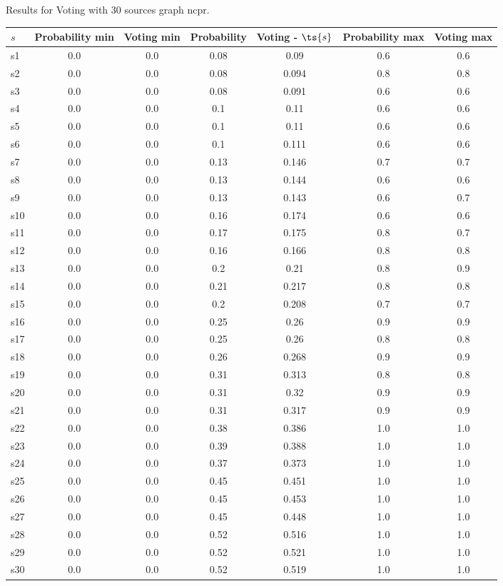 \documentclass{article}
\begin{document}
\noindent Results for Voting with 30 sources graph ncpr.

\noindent\begin{tabular}{|l|c|c|c|c|c|c|}
\hline
$s$& Probability min & Voting min & Probability & Voting - $\ts{s}$ & Probability max & Voting max\\
\hline
s1 &0.0 & 0.0 & 0.08 & 0.09 & 0.6 & 0.6\\
\hline
s2 &0.0 & 0.0 & 0.08 & 0.094 & 0.8 & 0.8\\
\hline
s3 &0.0 & 0.0 & 0.08 & 0.091 & 0.6 & 0.6\\
\hline
s4 &0.0 & 0.0 & 0.1 & 0.11 & 0.6 & 0.6\\
\hline
s5 &0.0 & 0.0 & 0.1 & 0.11 & 0.6 & 0.6\\
\hline
s6 &0.0 & 0.0 & 0.1 & 0.111 & 0.6 & 0.6\\
\hline
s7 &0.0 & 0.0 & 0.13 & 0.146 & 0.7 & 0.7\\
\hline
s8 &0.0 & 0.0 & 0.13 & 0.144 & 0.6 & 0.6\\
\hline
s9 &0.0 & 0.0 & 0.13 & 0.143 & 0.6 & 0.7\\
\hline
s10 &0.0 & 0.0 & 0.16 & 0.174 & 0.6 & 0.6\\
\hline
s11 &0.0 & 0.0 & 0.17 & 0.175 & 0.8 & 0.7\\
\hline
s12 &0.0 & 0.0 & 0.16 & 0.166 & 0.8 & 0.8\\
\hline
s13 &0.0 & 0.0 & 0.2 & 0.21 & 0.8 & 0.9\\
\hline
s14 &0.0 & 0.0 & 0.21 & 0.217 & 0.8 & 0.8\\
\hline
s15 &0.0 & 0.0 & 0.2 & 0.208 & 0.7 & 0.7\\
\hline
s16 &0.0 & 0.0 & 0.25 & 0.26 & 0.9 & 0.9\\
\hline
s17 &0.0 & 0.0 & 0.25 & 0.26 & 0.8 & 0.8\\
\hline
s18 &0.0 & 0.0 & 0.26 & 0.268 & 0.9 & 0.9\\
\hline
s19 &0.0 & 0.0 & 0.31 & 0.313 & 0.8 & 0.8\\
\hline
s20 &0.0 & 0.0 & 0.31 & 0.32 & 0.9 & 0.9\\
\hline
s21 &0.0 & 0.0 & 0.31 & 0.317 & 0.9 & 0.9\\
\hline
s22 &0.0 & 0.0 & 0.38 & 0.386 & 1.0 & 1.0\\
\hline
s23 &0.0 & 0.0 & 0.39 & 0.388 & 1.0 & 1.0\\
\hline
s24 &0.0 & 0.0 & 0.37 & 0.373 & 1.0 & 1.0\\
\hline
s25 &0.0 & 0.0 & 0.45 & 0.451 & 1.0 & 1.0\\
\hline
s26 &0.0 & 0.0 & 0.45 & 0.453 & 1.0 & 1.0\\
\hline
s27 &0.0 & 0.0 & 0.45 & 0.448 & 1.0 & 1.0\\
\hline
s28 &0.0 & 0.0 & 0.52 & 0.516 & 1.0 & 1.0\\
\hline
s29 &0.0 & 0.0 & 0.52 & 0.521 & 1.0 & 1.0\\
\hline
s30 &0.0 & 0.0 & 0.52 & 0.519 & 1.0 & 1.0\\
\hline
\end{tabular}\\
\end{document}
